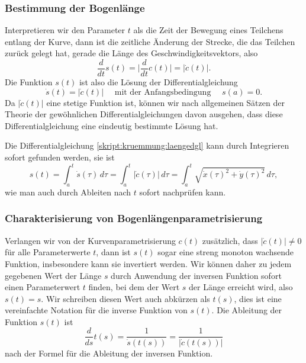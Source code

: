 \subsubsection{Bestimmung der Bogenlänge}
Interpretieren wir den Parameter $t$ als die Zeit der Bewegung eines 
Teilchens entlang der Kurve, dann ist die zeitliche Änderung der Strecke,
die das Teilchen zurück gelegt hat, gerade die Länge des
Geschwindigkeitsvektors, also
\[
\frac{d}{dt} s(t) = \biggl|\frac{d}{dt}c(t)\biggr| = |\dot c(t)|.
\]
Die Funktion $s(t)$ ist also die Lösung der Differentialgleichung
\begin{equation}
\dot s(t)=|\dot c(t)|
\quad
\text{ mit der Anfangsbedingung }\quad s(a)=0.
\label{skript:kruemmung:laengedgl}
\end{equation}
Da $|\dot c(t)|$ eine stetige Funktion ist, können wir nach allgemeinen
Sätzen der Theorie der gewöhnlichen Differentialgleichungen davon ausgehen,
dass diese Differentialgleichung eine eindeutig bestimmte Lösung hat.

Die Differentialgleichung \eqref{skript:kruemmung:laengedgl} kann 
durch Integrieren sofort gefunden werden, sie ist
\begin{equation}
s(t)
=
\int_a^t \dot s(\tau)\,d\tau
=
\int_a^t |\dot c(\tau)| \,d\tau
=
\int_a^t \sqrt{\dot x(\tau)^2 + \dot y(\tau)^2}\,d\tau,
\label{skript:kruemmung:laenge}
\end{equation}
wie man auch durch Ableiten nach $t$ sofort nachprüfen kann.

\subsubsection{Charakterisierung von Bogenlängenparametrisierung}
Verlangen wir von der Kurvenparametrisierung $c(t)$ zusätzlich,
dass $|\dot c(t)|\ne 0$ für alle Parameterwerte $t$, dann ist
$s(t)$ sogar eine streng monoton wachsende Funktion, insbesondere
kann sie invertiert werden.
Wir können daher zu jedem gegebenen Wert der Länge $s$ durch
Anwendung der inversen Funktion sofort einen Parameterwert $t$
finden, bei dem der Wert $s$ der Länge erreicht wird, also
$s(t)=s$.
Wir schreiben diesen Wert auch abkürzen als $t(s)$, dies ist eine
vereinfachte Notation für die inverse Funktion von $s(t)$.
Die Ableitung der Funktion $s(t)$ ist
\begin{equation}
\frac{d}{ds} t(s) = \frac{1}{\dot s(t(s))} = \frac1{|\dot c(t(s))|}
\label{skript:kruemmung:abllaengeinv}
\end{equation}
nach der Formel für die Ableitung der inversen Funktion.

